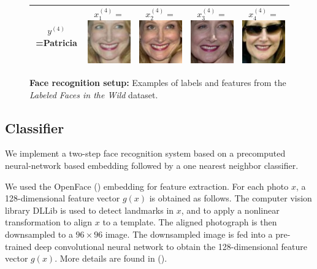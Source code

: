 \documentclass[twoside,11pt]{article}
\begin{document}
\begin{figure}
\begin{tabular}{|c|ccc|c|}
$y^{(4)}$=Patricia & 
  $x_1^{(4)} = $\includegraphics[scale = 0.2]{face_photos/Patricia_Clarkson_0001.png} &  
  $x_2^{(4)} = $\includegraphics[scale = 0.2]{face_photos/Patricia_Clarkson_0002.png} &  
  $x_3^{(4)} = $\includegraphics[scale = 0.2]{face_photos/Patricia_Clarkson_0003.png} &  
  $x_4^{(4)} = $\includegraphics[scale = 0.2]{face_photos/Patricia_Clarkson_0004.png} \\ \hline
\end{tabular}
\caption{\textbf{Face recognition setup:} Examples of labels and features from the \emph{Labeled Faces in the Wild} dataset.}
\label{fig:face_rec}
\end{figure}

\subsection{Classifier}
We implement a two-step face recognition system based on a precomputed neural-network based embedding followed by a one nearest neighbor classifier.

We used the OpenFace (\cite{amos2016openface}) embedding for feature
extraction.  For each photo $x$, a 128-dimensional feature vector
$g(x)$ is obtained as follows.  The computer vision library DLLib is
used to detect landmarks in $x$, and to apply a nonlinear
transformation to align $x$ to a template.  The aligned photograph is
then downsampled to a $96 \times 96$ image. The downsampled image is
fed into a pre-trained deep convolutional neural network to obtain the
128-dimensional feature vector $g(x)$. More details are found in
(\cite{amos2016openface}).
\end{document}
